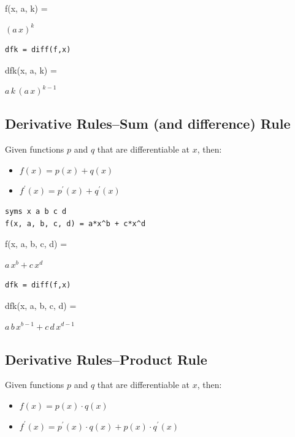 \documentclass[
]{book}
\begin{document}
f(x, a, k) =

\(\displaystyle {{\left(a\,x\right)}}^k\)

\begin{verbatim}
dfk = diff(f,x)
\end{verbatim}

dfk(x, a, k) =

\(\displaystyle a\,k\,{{\left(a\,x\right)}}^{k-1}\)

\hypertarget{derivative-rulessum-and-difference-rule}{%
\subsection{Derivative Rules--Sum (and difference) Rule}\label{derivative-rulessum-and-difference-rule}}

Given functions \(p\) and \(q\) that are differentiable at \(x\), then:

\begin{itemize}
\item
  \(\displaystyle f(x)=p(x)+q(x)\)
\item
  \(\displaystyle f^{\prime } (x)=p^{\prime } (x)+q^{\prime } (x)\)
\end{itemize}

\begin{verbatim}
syms x a b c d
f(x, a, b, c, d) = a*x^b + c*x^d
\end{verbatim}

f(x, a, b, c, d) =

\(\displaystyle a\,x^b +c\,x^d\)

\begin{verbatim}
dfk = diff(f,x)
\end{verbatim}

dfk(x, a, b, c, d) =

\(\displaystyle a\,b\,x^{b-1} +c\,d\,x^{d-1}\)

\hypertarget{derivative-rulesproduct-rule}{%
\subsection{Derivative Rules--Product Rule}\label{derivative-rulesproduct-rule}}

Given functions \(p\) and \(q\) that are differentiable at \(x\), then:

\begin{itemize}
\item
  \(\displaystyle f(x)=p(x)\cdot q(x)\)
\item
  \(\displaystyle f^{\prime } (x)=p^{\prime } (x)\cdot q(x)+p(x)\cdot q^{\prime } (x)\)
\end{itemize}
\end{document}
